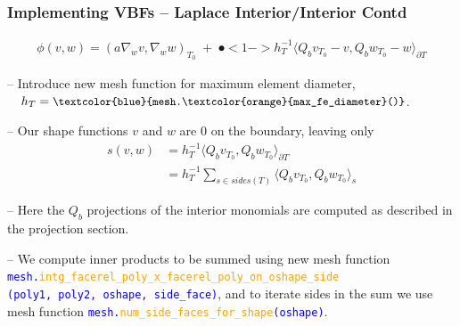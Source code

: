 \documentclass[compress]{beamer}
\begin{document}
\begin{frame}
  \frametitle{Implementing VBFs -- Laplace Interior/Interior Contd}
  \vspace{-.5cm}
  \begin{align*}
   \mathfrak \phi(v,w) = (a \nabla_w v,\nabla_w w)_{\scriptscriptstyle T_0} \;+\; 
   \spot<1->{h_T^{-1}\langle Q_b v_{\scriptscriptstyle T_0} - v,Q_b w_{\scriptscriptstyle T_0} - w \rangle_{\partial T}}
  \end{align*}

  \uncover<+-> {
  -- Introduce new mesh function for maximum element diameter,
     $\quad h_T = \texttt{\small \textcolor{blue}{mesh.\textcolor{orange}{max\_fe\_diameter}()}}$.
  
  \uncover<+-> {
  -- Our shape functions $v$ and $w$ are $0$ on the boundary, leaving only 
  \begin{align*}
    s(v,w) &= h_T^{-1} \langle Q_b v_{\scriptscriptstyle T_0}, Q_b w_{\scriptscriptstyle T_0} \rangle_{\partial T}\\
           &= h_T^{-1} \sum_{s \in sides(T)} \langle Q_b v_{\scriptscriptstyle T_0}, Q_b w_{\scriptscriptstyle T_0} \rangle_{s}
  \end{align*}
  
  \uncover<+-> {
  -- Here the $Q_b$ projections of the interior monomials are computed as described in the projection section.
  
  \uncover<+-> {
  -- We compute inner products to be summed using new mesh function\\
  \texttt{\small \textcolor{blue}{mesh.\textcolor{orange}{intg\_facerel\_poly\_x\_facerel\_poly\_on\_oshape\_side}\\
  \hspace{0.75cm}(poly1, poly2, oshape, side\_face)}}, and to iterate sides in the sum we use mesh function
  \texttt{\small \textcolor{blue}{mesh.\textcolor{orange}{num\_side\_faces\_for\_shape}(oshape)}}.
  }}}}
\end{frame}
\end{document}
